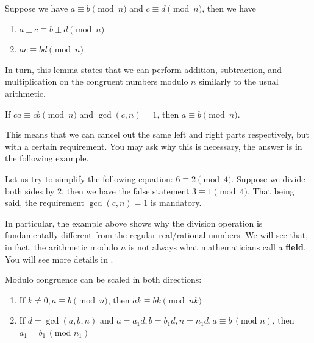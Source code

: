 \documentclass[../lecture-notes.tex]{subfiles}
\begin{document}
\begin{lemma}
    Suppose we have $a \equiv b \pmod{n}$ and $c \equiv d \pmod{n}$, then we have 
        \begin{enumerate}
            \item $a \pm c \equiv b \pm d \pmod{n}$
            \item $ac \equiv bd \pmod{n}$
        \end{enumerate}
\end{lemma}

In turn, this lemma states that we can perform addition, subtraction, and multiplication on the congruent numbers modulo $n$ similarly to the usual arithmetic.

\begin{lemma}
    If $ca \equiv cb \pmod{n}$ and $\gcd(c, n) = 1$, then $ a \equiv b \pmod{n}$.
\end{lemma}

This means that we can cancel out the same left and right parts respectively, but with a certain requirement. You may ask why this is necessary, the answer is in the following example.

\begin{example}
    Let us try to simplify the following equation: $6 \equiv 2 \pmod{4}$. Suppose we divide both sides by $2$, then we have the false statement $3 \equiv 1 \pmod{4}$. That being said, the requirement $\gcd(c, n) = 1$ is mandatory. 
\end{example}

\begin{remark}
    In particular, the example above shows why the division operation is fundamentally different from the regular real/rational numbers. We will see that, in fact, the arithmetic modulo $n$ is not always what mathematicians call a \textbf{field}. You will see more details in .
\end{remark}

\begin{lemma} \label{lemma:congruence_scale}
    Modulo congruence can be scaled in both directions:
    
    \begin{enumerate}
        \item If $k \neq 0, a \equiv b \pmod{n}$, then $ak \equiv bk \pmod{nk}$
        \item If $d = \gcd(a, b, n) \text{ and } a = a_1d, b =b_1d, n = n_1d, a \equiv b \, (\text{mod } n)$, then $a_1 = b_1 \, (\text{mod } n_1)$
    \end{enumerate}
\end{lemma}
\end{document}
